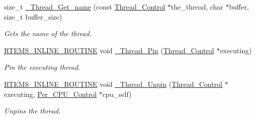 \begin{DoxyCompactItemize}
size\+\_\+t \mbox{\hyperlink{group__RTEMSScoreThread_ga590ea63fba22ecee184711c5d2a98227}{\+\_\+\+Thread\+\_\+\+Get\+\_\+name}} (const \mbox{\hyperlink{struct__Thread__Control}{Thread\+\_\+\+Control}} $\ast$the\+\_\+thread, char $\ast$buffer, size\+\_\+t buffer\+\_\+size)
\begin{DoxyCompactList}\small\item\em Gets the name of the thread. \end{DoxyCompactList}\item 
\mbox{\hyperlink{group__RTEMSScoreBaseDefs_gac216239df231d5dbd15e3520b0b9313f}{R\+T\+E\+M\+S\+\_\+\+I\+N\+L\+I\+N\+E\+\_\+\+R\+O\+U\+T\+I\+NE}} void \mbox{\hyperlink{group__RTEMSScoreThread_gadfd1ad906bc42377d1c7b48aaba36c50}{\+\_\+\+Thread\+\_\+\+Pin}} (\mbox{\hyperlink{struct__Thread__Control}{Thread\+\_\+\+Control}} $\ast$executing)
\begin{DoxyCompactList}\small\item\em Pin the executing thread. \end{DoxyCompactList}\item 
\mbox{\hyperlink{group__RTEMSScoreBaseDefs_gac216239df231d5dbd15e3520b0b9313f}{R\+T\+E\+M\+S\+\_\+\+I\+N\+L\+I\+N\+E\+\_\+\+R\+O\+U\+T\+I\+NE}} void \mbox{\hyperlink{group__RTEMSScoreThread_gafc95fd103c5bcd79927f316370080340}{\+\_\+\+Thread\+\_\+\+Unpin}} (\mbox{\hyperlink{struct__Thread__Control}{Thread\+\_\+\+Control}} $\ast$executing, \mbox{\hyperlink{structPer__CPU__Control}{Per\+\_\+\+C\+P\+U\+\_\+\+Control}} $\ast$cpu\+\_\+self)
\begin{DoxyCompactList}\small\item\em Unpins the thread. \end{DoxyCompactList}\end{DoxyCompactItemize}
